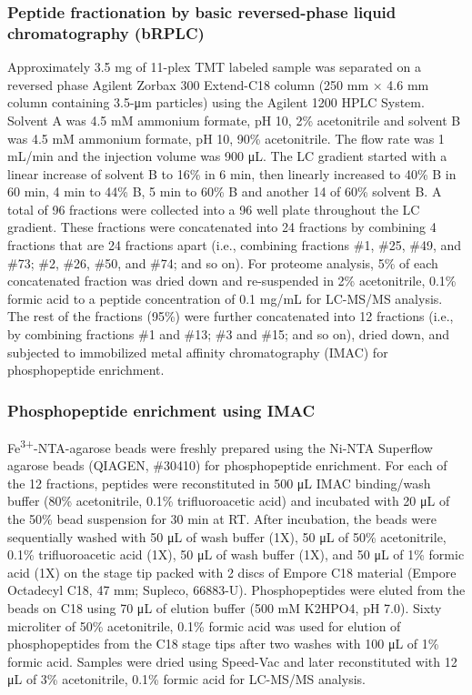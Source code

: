 \subsubsection{Peptide fractionation by basic reversed-phase liquid chromatography (bRPLC)}
Approximately 3.5 mg of 11-plex TMT labeled sample was separated on a reversed phase Agilent Zorbax 300 Extend-C18 column (250 mm × 4.6 mm column containing 3.5-μm particles) using the Agilent 1200 HPLC System. Solvent A was 4.5 mM ammonium formate, pH 10, 2\% acetonitrile and solvent B was 4.5 mM ammonium formate, pH 10, 90\% acetonitrile. The flow rate was 1 mL/min and the injection volume was 900 μL. The LC gradient started with a linear increase of solvent B to 16\% in 6 min, then linearly increased to 40\% B in 60 min, 4 min to 44\% B, 5 min to 60\% B and another 14 of 60\% solvent B. A total of 96 fractions were collected into a 96 well plate throughout the LC gradient. These fractions were concatenated into 24 fractions by combining 4 fractions that are 24 fractions apart (i.e., combining fractions \#1, \#25, \#49, and \#73; \#2, \#26, \#50, and \#74; and so on). For proteome analysis, 5\% of each concatenated fraction was dried down and re-suspended in 2\% acetonitrile, 0.1\% formic acid to a peptide concentration of 0.1 mg/mL for LC-MS/MS analysis. The rest of the fractions (95\%) were further concatenated into 12 fractions (i.e., by combining fractions \#1 and \#13; \#3 and \#15; and so on), dried down, and subjected to immobilized metal affinity chromatography (IMAC) for phosphopeptide enrichment.

\subsubsection{Phosphopeptide enrichment using IMAC}
Fe\textsuperscript{3+}-NTA-agarose beads were freshly prepared using the Ni-NTA Superflow agarose beads (QIAGEN, \#30410) for phosphopeptide enrichment. For each of the 12 fractions, peptides were reconstituted in 500 μL IMAC binding/wash buffer (80\% acetonitrile, 0.1\% trifluoroacetic acid) and incubated with 20 μL of the 50\% bead suspension for 30 min at RT. After incubation, the beads were sequentially washed with 50 μL of wash buffer (1X), 50 μL of 50\% acetonitrile, 0.1\% trifluoroacetic acid (1X), 50 μL of wash buffer (1X), and 50 μL of 1\% formic acid (1X) on the stage tip packed with 2 discs of Empore C18 material (Empore Octadecyl C18, 47 mm; Supleco, 66883-U). Phosphopeptides were eluted from the beads on C18 using 70 μL of elution buffer (500 mM K2HPO4, pH 7.0). Sixty microliter of 50\% acetonitrile, 0.1\% formic acid was used for elution of phosphopeptides from the C18 stage tips after two washes with 100 μL of 1\% formic acid. Samples were dried using Speed-Vac and later reconstituted with 12 μL of 3\% acetonitrile, 0.1\% formic acid for LC-MS/MS analysis.

